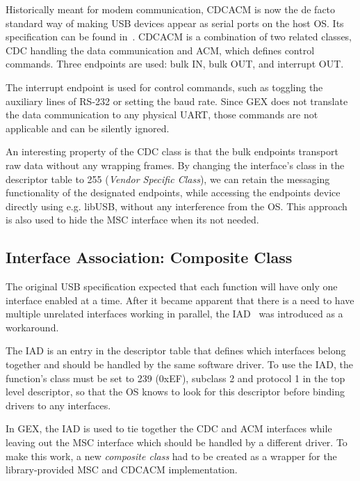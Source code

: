 
Historically meant for modem communication, \gls{CDCACM} is now the de facto standard way of making \gls{USB} devices appear as serial ports on the host \gls{OS}. Its specification can be found in~\cite{usbif-cdc}. \gls{CDCACM} is a combination of two related classes, \gls{CDC} handling the data communication and \gls{ACM}, which defines control commands. Three endpoints are used: bulk IN, bulk OUT, and interrupt OUT.

The interrupt endpoint is used for control commands, such as toggling the auxiliary lines of RS-232 or setting the baud rate. Since GEX does not translate the data communication to any physical UART, those commands are not applicable and can be silently ignored.

An interesting property of the \gls{CDC} class is that the bulk endpoints transport raw data without any wrapping frames. By changing the interface's class in the descriptor table to 255 (\textit{Vendor Specific Class}), we can retain the messaging functionality of the designated endpoints, while accessing the endpoints device directly using e.g. libUSB, without any interference from the \gls{OS}. This approach is also used to hide the \gls{MSC} interface when its not needed.

\subsection{Interface Association: Composite Class}

The original \gls{USB} specification expected that each function will have only one interface enabled at a time. After it became apparent that there is a need to have multiple unrelated interfaces working in parallel, the \gls{IAD}~\cite{usbif-iad} was introduced as a workaround.

The \gls{IAD} is an entry in the descriptor table that defines which interfaces belong together and should be handled by the same software driver. To use the \gls{IAD}, the function's class must be set to 239 (0xEF), subclass 2 and protocol 1 in the top level descriptor, so that the \gls{OS} knows to look for this descriptor before binding drivers to any interfaces.

In GEX, the \gls{IAD} is used to tie together the \gls{CDC} and \gls{ACM} interfaces while leaving out the \gls{MSC} interface which should be handled by a different driver. To make this work, a new \textit{composite class} had to be created as a wrapper for the library-provided \gls{MSC} and \gls{CDCACM} implementation.

